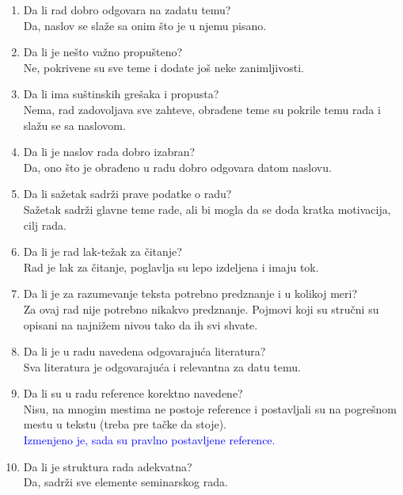 \documentclass[a4paper]{report}
\newcommand{\odgovor}[1]{\textcolor{blue}{#1}}
\begin{document}
\begin{enumerate}
\item Da li rad dobro odgovara na zadatu temu?\\
Da, naslov se slaže sa onim što je u njemu pisano.

\item Da li je nešto važno propušteno?\\
Ne, pokrivene su sve teme i dodate još neke zanimljivosti.

\item Da li ima suštinskih grešaka i propusta?\\
Nema, rad zadovoljava sve zahteve, obrađene teme su pokrile temu rada i slažu se sa naslovom.

\item Da li je naslov rada dobro izabran?\\
Da, ono što je obrađeno u radu dobro odgovara datom naslovu.

\item Da li sažetak sadrži prave podatke o radu?\\
Sažetak sadrži glavne teme rade, ali bi mogla da se doda kratka motivacija, cilj rada.

\item Da li je rad lak-težak za čitanje?\\
Rad je lak za čitanje, poglavlja su lepo izdeljena i imaju tok.

\item Da li je za razumevanje teksta potrebno predznanje i u kolikoj meri?\\
Za ovaj rad nije potrebno nikakvo predznanje. Pojmovi koji su stručni su opisani na najnižem nivou tako da ih svi shvate.

\item Da li je u radu navedena odgovarajuća literatura?\\
Sva literatura je odgovarajuća i relevantna za datu temu. 

\item Da li su u radu reference korektno navedene?\\
Nisu, na mnogim mestima ne postoje reference i postavljali su na pogrešnom mestu u tekstu (treba pre tačke da stoje). \\
\odgovor{Izmenjeno je, sada su pravlno postavljene reference.}

\item Da li je struktura rada adekvatna?\\
Da, sadrži sve elemente seminarskog rada.


\end{enumerate}
\end{document}
